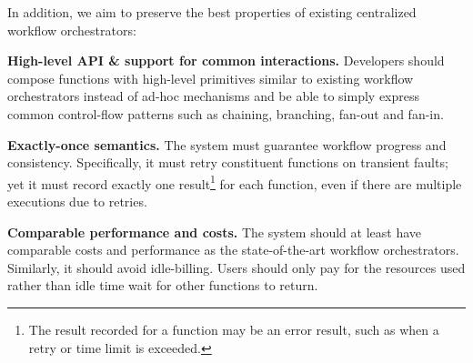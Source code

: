 In addition, we aim to preserve the best properties of existing centralized workflow orchestrators:

\squishlist
    \item \textbf{High-level API \& support for common interactions.}
    Developers should compose functions with high-level primitives similar to
    existing workflow orchestrators instead of ad-hoc mechanisms and be able
    to simply express common control-flow patterns such as chaining,
    branching, fan-out and fan-in.

    \item \textbf{Exactly-once semantics.} The system must guarantee workflow 
    progress and consistency. Specifically, it must retry constituent functions on transient faults;
    yet it must record exactly one result\footnote{The result recorded 
    for a function may be an error result, such as when a retry or time limit is exceeded.} 
    for each function, 
    even if there are multiple executions due to retries.%

    \item \textbf{Comparable performance and costs.} The system should at least
    have comparable costs and performance as the state-of-the-art workflow
    orchestrators. Similarly, it should avoid idle-billing. Users should only pay
    for the resources used rather than idle time wait for other functions to
    return. 


\squishend






